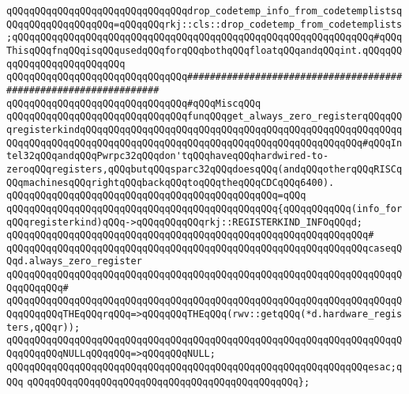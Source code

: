 \verb|qQQqqQQqqQQqqQQqqQQqqQQqqQQqqQQqdrop_codetemp_info_from_codetemplistsqQQqqQQqqQQqqQQqqQQq=qQQqqQQqrkj::cls::drop_codetemp_from_codetemplists;qQQqqQQqqQQqqQQqqQQqqQQqqQQqqQQqqQQqqQQqqQQqqQQqqQQqqQQqqQQqqQQq#qQQqThisqQQqfnqQQqisqQQqusedqQQqforqQQqbothqQQqfloatqQQqandqQQqint.qQQqqQQqqQQqqQQqqQQqqQQqqQQq|\newline
\newline
\newline
\newline
\newline
\verb|qQQqqQQqqQQqqQQqqQQqqQQqqQQqqQQq#################################################################|\newline
\verb|qQQqqQQqqQQqqQQqqQQqqQQqqQQqqQQq#qQQqMiscqQQq|\newline
\newline
\verb|qQQqqQQqqQQqqQQqqQQqqQQqqQQqqQQqfunqQQqget_always_zero_registerqQQqqQQqregisterkindqQQqqQQqqQQqqQQqqQQqqQQqqQQqqQQqqQQqqQQqqQQqqQQqqQQqqQQqqQQqqQQqqQQqqQQqqQQqqQQqqQQqqQQqqQQqqQQqqQQqqQQqqQQqqQQqqQQqqQQq#qQQqIntel32qQQqandqQQqPwrpc32qQQqdon'tqQQqhaveqQQqhardwired-to-zeroqQQqregisters,qQQqbutqQQqsparc32qQQqdoesqQQq(andqQQqotherqQQqRISCqQQqmachinesqQQqrightqQQqbackqQQqtoqQQqtheqQQqCDCqQQq6400).|\newline
\verb|qQQqqQQqqQQqqQQqqQQqqQQqqQQqqQQqqQQqqQQqqQQqqQQq=qQQq|\newline
\verb|qQQqqQQqqQQqqQQqqQQqqQQqqQQqqQQqqQQqqQQqqQQqqQQq{qQQqqQQqqQQq(info_forqQQqregisterkind)qQQq->qQQqqQQqqQQqrkj::REGISTERKIND_INFOqQQqd;|\newline
\verb|qQQqqQQqqQQqqQQqqQQqqQQqqQQqqQQqqQQqqQQqqQQqqQQqqQQqqQQqqQQqqQQq#|\newline
\verb|qQQqqQQqqQQqqQQqqQQqqQQqqQQqqQQqqQQqqQQqqQQqqQQqqQQqqQQqqQQqqQQqcaseqQQqd.always_zero_register|\newline
\verb|qQQqqQQqqQQqqQQqqQQqqQQqqQQqqQQqqQQqqQQqqQQqqQQqqQQqqQQqqQQqqQQqqQQqqQQqqQQqqQQq#|\newline
\verb|qQQqqQQqqQQqqQQqqQQqqQQqqQQqqQQqqQQqqQQqqQQqqQQqqQQqqQQqqQQqqQQqqQQqqQQqqQQqqQQqTHEqQQqrqQQq=>qQQqqQQqTHEqQQq(rwv::getqQQq(*d.hardware_registers,qQQqr));|\newline
\verb|qQQqqQQqqQQqqQQqqQQqqQQqqQQqqQQqqQQqqQQqqQQqqQQqqQQqqQQqqQQqqQQqqQQqqQQqqQQqqQQqNULLqQQqqQQq=>qQQqqQQqNULL;|\newline
\verb|qQQqqQQqqQQqqQQqqQQqqQQqqQQqqQQqqQQqqQQqqQQqqQQqqQQqqQQqqQQqqQQqesac;qQQq|\newline
\verb|qQQqqQQqqQQqqQQqqQQqqQQqqQQqqQQqqQQqqQQqqQQqqQQq};|\newline
